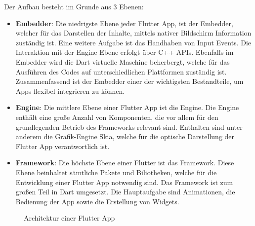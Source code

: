 Der Aufbau besteht im Grunde aus 3 Ebenen:
\begin{itemize}
\item \textbf{Embedder}:
Die niedrigste Ebene jeder Flutter App, ist der Embedder, welcher für das Darstellen der Inhalte, mittels nativer Bildschirm Information zuständig ist. Eine weitere Aufgabe ist das Handhaben von Input Events. Die Interaktion mit der Engine Ebene erfolgt über C++ APIs. Ebenfalls im Embedder wird die Dart virtuelle Maschine beherbergt, welche für das Ausführen des Codes auf unterschiedlichen Plattformen zuständig ist. Zusammenfassend ist der Embedder einer der wichtigsten Bestandteile, um Apps flexibel integrieren zu können.

\item \textbf{Engine}:
Die mittlere Ebene einer Flutter App ist die Engine. Die Engine enthält eine große Anzahl von Komponenten, die vor allem für den grundlegenden Betrieb des Frameworks relevant sind. Enthalten sind unter anderem die Grafik-Engine Skia, welche für die optische Darstellung der Flutter App verantwortlich ist.

\item \textbf{Framework}:
Die höchste Ebene einer Flutter ist das Framework. Diese Ebene beinhaltet sämtliche Pakete und Biliotheken, welche für die Entwicklung einer Flutter App notwendig sind. Das Framework ist zum großen Teil in Dart umgesetzt. Die Hauptaufgabe sind Animationen, die Bedienung der App sowie die Erstellung von Widgets.
\end{itemize}
\begin{figure}[h!]
  \centering
  
  \caption{Architektur einer Flutter App \cite{Flutter-Architektur-SVG}}
\end{figure}

\newpage


